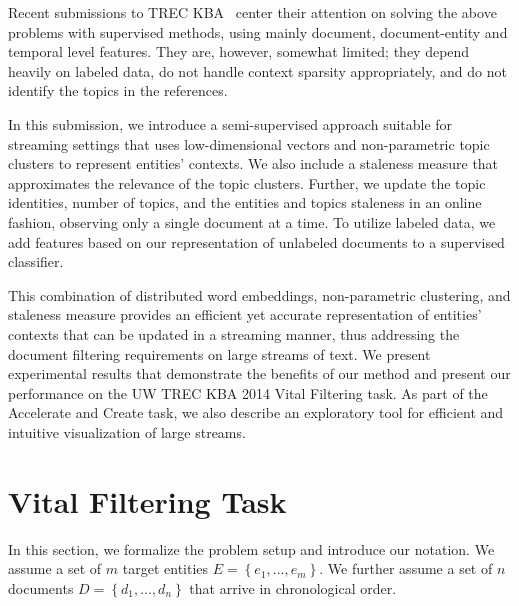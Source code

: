 \documentclass{sig-alternate}
\begin{document}
Recent submissions to TREC KBA~\cite{xitong13, bouvier13, efron13, zhang13, bellogin13} center their attention on solving the above problems with supervised methods, using mainly document, document-entity and temporal level features.
They are, however, somewhat limited; they depend heavily on labeled data, do not handle context sparsity appropriately, and do not identify the topics in the references. %


In this submission, we introduce a semi-supervised approach suitable for streaming settings that uses low-dimensional vectors and non-parametric topic clusters to represent entities' contexts. We also include a staleness measure that approximates the relevance of the topic clusters. %
Further, we update the topic identities, number of topics, and the entities and topics staleness in an online fashion, observing only a single document at a time.
To utilize labeled data, we add features based on our representation of unlabeled documents to a supervised classifier.

This combination of distributed word embeddings, non-parametric clustering, and staleness measure provides an efficient yet accurate representation of entities' contexts that can be updated in a streaming manner, thus addressing the document filtering requirements on large streams of text.
We present experimental results that demonstrate the benefits of our method and present our performance on the UW TREC KBA 2014 Vital Filtering task.
As part of the Accelerate and Create task, we also describe an exploratory tool for efficient and intuitive visualization of large streams.

\section{Vital Filtering Task}
\label{background}

In this section, we formalize the problem setup and introduce our notation. 
We assume a set of $m$ target entities $E = \left\{ {e_1, ..., e_m}\right\}$. We further assume a set of $n$ documents $D = \left\{ {d_{1}, ..., d_{n}}\right\}$ that arrive in chronological order. 
 
\end{document}
